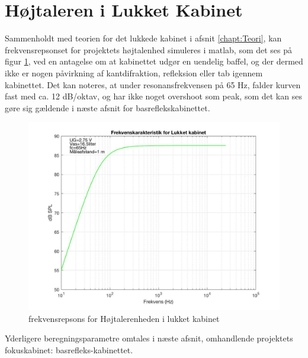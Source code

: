 \section{Højtaleren i Lukket Kabinet}
Sammenholdt med teorien for det lukkede kabinet i afsnit \ref{chapt:Teori}, kan frekvensrepsonset for projektets højtalenhed simuleres i matlab, som det ses på figur \ref{fig:simLukketKab}, ved en antagelse om at kabinettet udgør en uendelig baffel, og der dermed ikke er nogen påvirkning af kantdifraktion, refleksion eller tab igennem kabinettet.  
Det kan noteres, at under resonansfrekvensen på 65 Hz, falder kurven fast med ca. 12 dB/oktav, og har ikke noget overshoot som peak, som det kan ses gøre sig gældende i næste afsnit for basreflekskabinettet. 

\begin{figure}[h!]
	\centering
	\includegraphics[width=.8\textwidth]{Pics/simLukketKab}
	\caption{frekvensrepsons for Højtalerenheden i lukket kabinet } 
	\label{fig:simLukketKab}
\end{figure}

Yderligere beregningsparametre omtales i næste afsnit, omhandlende projektets fokuskabinet: basrefleks-kabinettet. 


